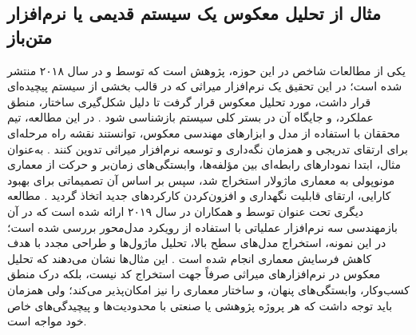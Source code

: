 
\subsection*{مثال از تحلیل معکوس یک سیستم قدیمی یا نرم‌افزار متن‌باز}
یکی از مطالعات شاخص در این حوزه، پژوهش  است که توسط  و  در سال ۲۰۱۸ منتشر شده است؛ در این تحقیق یک نرم‌افزار میراثی که در قالب بخشی از سیستم پیچیده‌ای قرار داشت، مورد تحلیل معکوس قرار گرفت تا دلیل شکل‌گیری ساختار، منطق عملکرد، و جایگاه آن در بستر کلی سیستم بازشناسی شود \cite{moraga2018}.
در این مطالعه، تیم محققان با استفاده از مدل  و ابزارهای مهندسی معکوس، توانستند نقشه راه مرحله‌ای برای ارتقای تدریجی و همزمان نگه‌داری و توسعه نرم‌افزار میراثی تدوین کنند \cite{moraga2018}. 
به‌عنوان مثال، ابتدا نمودارهای رابطه‌ای بین مؤلفه‌ها، وابستگی‌های زمان‌بر و حرکت از معماری مونوپولی به معماری ماژولار استخراج شد، سپس بر اساس آن تصمیماتی برای بهبود کارایی، ارتقای قابلیت نگهداری و افزون‌کردن کارکردهای جدید اتخاذ گردید \cite{moraga2018}.
مطالعه دیگری تحت عنوان  توسط  و همکاران در سال ۲۰۱۹ ارائه شده است که در آن بازمهندسی سه نرم‌افزار عملیاتی با استفاده از رویکرد مدل‌محور بررسی شده است؛ در این نمونه، استخراج مدل‌های سطح بالا، تحلیل ماژول‌ها و طراحی مجدد با هدف کاهش فرسایش معماری انجام شده است \cite{pascal2019}.
این مثال‌ها نشان می‌دهند که تحلیل معکوس در نرم‌افزارهای میراثی صرفاً جهت استخراج کد نیست، بلکه درک منطق کسب‌وکار، وابستگی‌های پنهان، و ساختار معماری را نیز امکان‌پذیر می‌کند؛ ولی همزمان باید توجه داشت که هر پروژه پژوهشی یا صنعتی با محدودیت‌ها و پیچیدگی‌های خاص خود مواجه است.

